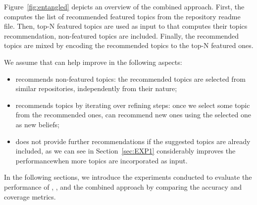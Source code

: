 Figure~\ref{fig:entangled} depicts an overview of the combined approach. First, the \MNB computes the list of recommended featured topics from the repository readme file. Then, top-N featured topics are used as input to \TF that computes their topics recommendation, \ie non-featured topics are included. Finally, the recommended topics are mixed by encoding the \TF recommended topics to the top-N featured ones.

We assume that \TF can help improve \MNB in the following aspects:
\begin{itemize}
	\item \TF recommends non-featured topics: the recommended topics are selected from similar repositories, independently from their nature;
	\item \TF recommends topics by iterating over refining steps: once we select some topic from the recommended ones, \TF can recommend new ones using the selected one as new beliefs;
	\item \MNB does not provide further recommendations if the suggested topics are already included, as we can see in Section~\ref{sec:EXP1} \TF considerably improves the performancewhen more topics are incorporated as input.
\end{itemize}

In the following sections, we introduce the experiments conducted to evaluate the performance of \TF, \MNB, and the combined approach by comparing the accuracy and coverage metrics.

